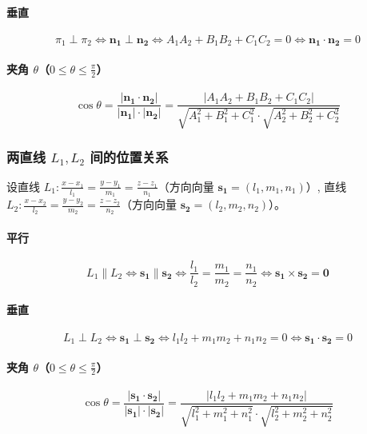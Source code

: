 \documentclass[UTF8]{ctexart}
\theoremstyle{remark}
\begin{document}
			\paragraph{垂直}  
			\[ \pi_1 \perp \pi_2 \Leftrightarrow \boldsymbol{n_1} \perp \boldsymbol{n_2} \Leftrightarrow A_1A_2 + B_1B_2 + C_1C_2 = 0 \Leftrightarrow \boldsymbol{n_1} \cdot \boldsymbol{n_2} = 0 \]  
			
			\paragraph{夹角 \(\theta\)（\(0 \leqslant \theta \leqslant \frac{\pi}{2}\)）}  
			\[ \cos\theta = \frac{|\boldsymbol{n_1} \cdot \boldsymbol{n_2}|}{|\boldsymbol{n_1}| \cdot |\boldsymbol{n_2}|} = \frac{|A_1A_2 + B_1B_2 + C_1C_2|}{\sqrt{A_1^2 + B_1^2 + C_1^2} \cdot \sqrt{A_2^2 + B_2^2 + C_2^2}} \]  
			
			
			\subsubsection*{两直线 \(L_1, L_2\) 间的位置关系}
			设直线 \(L_1: \frac{x - x_1}{l_1} = \frac{y - y_1}{m_1} = \frac{z - z_1}{n_1}\)（方向向量 \(\boldsymbol{s_1} = (l_1, m_1, n_1)\)）,  
			直线 \(L_2: \frac{x - x_2}{l_2} = \frac{y - y_2}{m_2} = \frac{z - z_2}{n_2}\)（方向向量 \(\boldsymbol{s_2} = (l_2, m_2, n_2)\)）。  
			
			\paragraph{平行}  
			\[ L_1 \parallel L_2 \Leftrightarrow \boldsymbol{s_1} \parallel \boldsymbol{s_2} \Leftrightarrow \frac{l_1}{l_2} = \frac{m_1}{m_2} = \frac{n_1}{n_2} \Leftrightarrow \boldsymbol{s_1} \times \boldsymbol{s_2} = \boldsymbol{0} \]  
			
			\paragraph{垂直}  
			\[ L_1 \perp L_2 \Leftrightarrow \boldsymbol{s_1} \perp \boldsymbol{s_2} \Leftrightarrow l_1l_2 + m_1m_2 + n_1n_2 = 0 \Leftrightarrow \boldsymbol{s_1} \cdot \boldsymbol{s_2} = 0 \]  
			
			\paragraph{夹角 \(\theta\)（\(0 \leqslant \theta \leqslant \frac{\pi}{2}\)）}  
			\[ \cos\theta = \frac{|\boldsymbol{s_1} \cdot \boldsymbol{s_2}|}{|\boldsymbol{s_1}| \cdot |\boldsymbol{s_2}|} = \frac{|l_1l_2 + m_1m_2 + n_1n_2|}{\sqrt{l_1^2 + m_1^2 + n_1^2} \cdot \sqrt{l_2^2 + m_2^2 + n_2^2}} \]  
			
\end{document}
